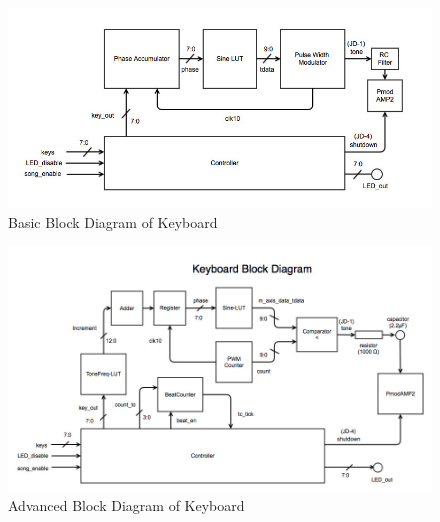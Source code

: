 \documentclass{article}
\begin{document}

      \begin{figure}[H]
        \centering
        \includegraphics[width=6.5in]{img/basicblock.jpg}
        \caption{Basic Block Diagram of Keyboard}
      \end{figure}

      \begin{figure}[H]
        \centering
        \includegraphics[width=7in]{img/KeyboardBlock.jpg}
        \caption{Advanced Block Diagram of Keyboard}
      \end{figure}
\end{document}

